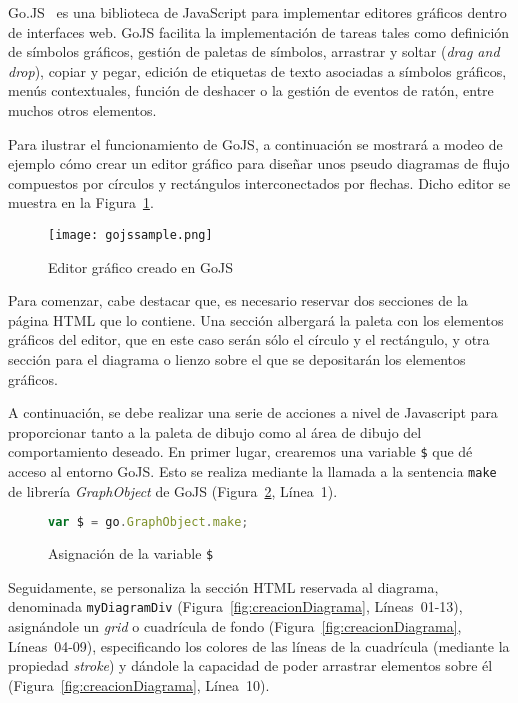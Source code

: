 Go.JS~\cite{gojs} es una biblioteca de JavaScript para implementar editores gráficos dentro de interfaces web. GoJS facilita la implementación de tareas tales como definición de símbolos gráficos, gestión de paletas de símbolos, arrastrar y soltar (\emph{drag and drop}), copiar y pegar, edición de etiquetas de texto asociadas a símbolos gráficos, menús contextuales, función de deshacer o la gestión de eventos de ratón, entre muchos otros elementos.

Para ilustrar el funcionamiento de GoJS, a continuación se mostrará a modeo de ejemplo cómo crear un editor gráfico para diseñar unos pseudo diagramas de flujo compuestos por círculos y rectángulos interconectados por flechas. Dicho editor se muestra en la Figura~\ref{fig:gojssample}.

\begin{figure}[!tb]
	\centering
	\texttt{[image: gojssample.png]}
	\caption{Editor gráfico creado en GoJS}
    \label{fig:gojssample}
\end{figure}

Para comenzar, cabe destacar que, es necesario reservar dos secciones de la página HTML que lo contiene. Una sección albergará la paleta con los elementos gráficos del editor, que en este caso serán sólo el círculo y el rectángulo, y otra sección para el diagrama o lienzo sobre el que se depositarán los elementos gráficos.

A continuación, se debe realizar una serie de acciones a nivel de Javascript para proporcionar tanto a la paleta de dibujo como al área de dibujo del comportamiento deseado. En primer lugar, crearemos una variable \texttt{\$} que dé acceso al entorno GoJS. Esto se realiza mediante la llamada a la sentencia \texttt{make} de librería \emph{GraphObject} de GoJS (Figura~\ref{fig:asignacionDollar}, Línea~1).

\begin{figure}[!tb]
	\centering
	\begin{lstlisting}[language=JavaScript]
	var $ = go.GraphObject.make;\end{lstlisting}
	\caption{Asignación de la variable \texttt{\$}}
	\label{fig:asignacionDollar}
\end{figure}

Seguidamente, se personaliza la sección HTML reservada al diagrama, denominada \texttt{myDiagramDiv} (Figura~\ref{fig:creacionDiagrama}, Líneas~01-13), asignándole un \emph{grid} o cuadrícula de fondo (Figura~\ref{fig:creacionDiagrama}, Líneas~04-09), especificando los colores de las líneas de la cuadrícula (mediante la propiedad \emph{stroke}) y dándole la capacidad de poder arrastrar elementos sobre él (Figura~\ref{fig:creacionDiagrama}, Línea~10).

